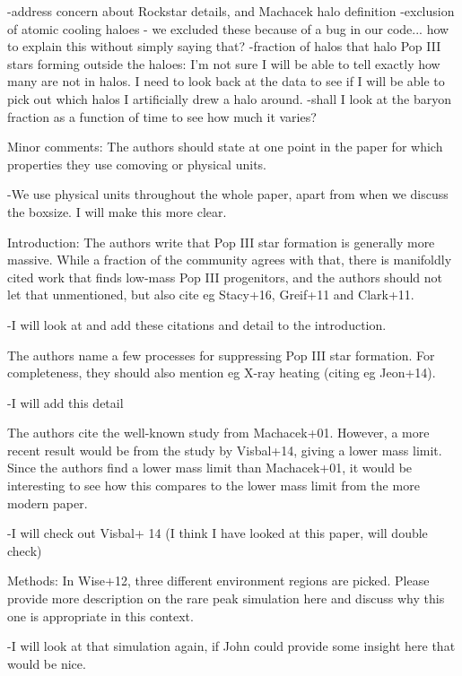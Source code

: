 \documentclass[11pt]{article}
\begin{document}
-address concern about Rockstar details, and Machacek halo definition
-exclusion of atomic cooling haloes - we excluded these because of a bug in our code... how to explain this without simply saying that?
-fraction of halos that halo Pop III stars forming outside the haloes: I'm not sure I will be able to tell exactly how many are not in halos. I need to look back at the data to see if I will be able to pick out which halos I artificially drew a halo around. 
-shall I look at the baryon fraction as a function of time to see how much it varies? 

\begin{referee}
Minor comments:
The authors should state at one point in the paper for which properties they use comoving or physical units.
\end{referee}
-We use physical units throughout the whole paper, apart from when we discuss the boxsize. I will make this more clear. 

\begin{referee}
Introduction:
The authors write that Pop III star formation is generally more massive. While a fraction of the community agrees with that, there is manifoldly cited work that finds low-mass Pop III progenitors, and the authors should not let that unmentioned, but also cite eg Stacy+16, Greif+11 and Clark+11.
\end{referee}
-I will look at and add these citations and detail to the introduction.

\begin{referee}
The authors name a few processes for suppressing Pop III star formation. For completeness, they should also mention eg X-ray heating (citing eg Jeon+14). 
\end{referee}
-I will add this detail

\begin{referee}
The authors cite the well-known study from Machacek+01. However, a more recent result would be from the study by Visbal+14, giving a lower mass limit. Since the authors find a lower mass limit than Machacek+01, it would be interesting to see how this compares to the lower mass limit from the more modern paper.
\end{referee}
-I will check out Visbal+ 14 (I think I have looked at this paper, will double check)

\begin{referee}
Methods:
In Wise+12, three different environment regions are picked. Please provide more description on the rare peak simulation here and discuss why this one is appropriate in this context.
\end{referee}
-I will look at that simulation again, if John could provide some insight here that would be nice.
\end{document}
